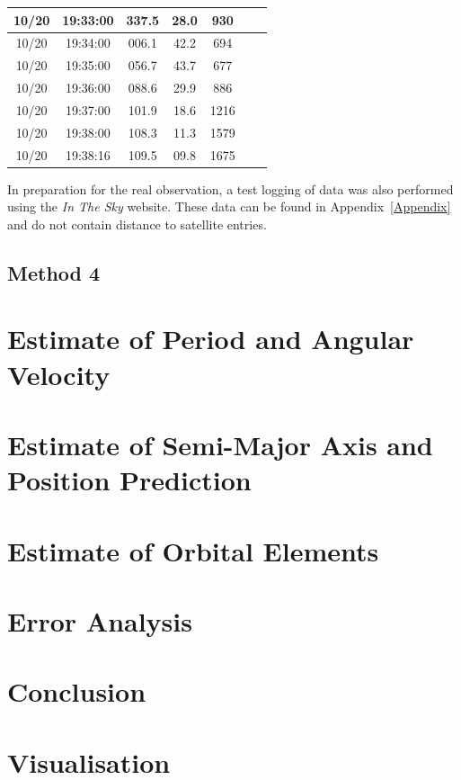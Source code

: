 \documentclass{article}
\begin{document}
\begin{table}[H]
\begin{tabular}{|c|c|c|c|c|c|c|}
        10/20 & 19:33:00 & 337.5 & 28.0 &  930 &  &  \\ \hline
        10/20 & 19:34:00 & 006.1 & 42.2 &  694 &  &  \\ \hline
        10/20 & 19:35:00 & 056.7 & 43.7 &  677 &  &  \\ \hline
        10/20 & 19:36:00 & 088.6 & 29.9 &  886 &  &  \\ \hline
        10/20 & 19:37:00 & 101.9 & 18.6 & 1216 &  &  \\ \hline
        10/20 & 19:38:00 & 108.3 & 11.3 & 1579 &  &  \\ \hline
        10/20 & 19:38:16 & 109.5 & 09.8 & 1675 &  &  \\ \hline
    \end{tabular}
\end{table}

In preparation for the real observation, a test logging of data was also performed using the \textit{In The Sky} website. These data can be found in Appendix~\ref{Appendix} and do not contain distance to satellite entries.

\subsection{Method 4}

\section{Estimate of Period and Angular Velocity}

\section{Estimate of Semi-Major Axis and Position Prediction}

\section{Estimate of Orbital Elements}

\section{Error Analysis}

\section{Conclusion}

\section{Visualisation}
\end{document}
